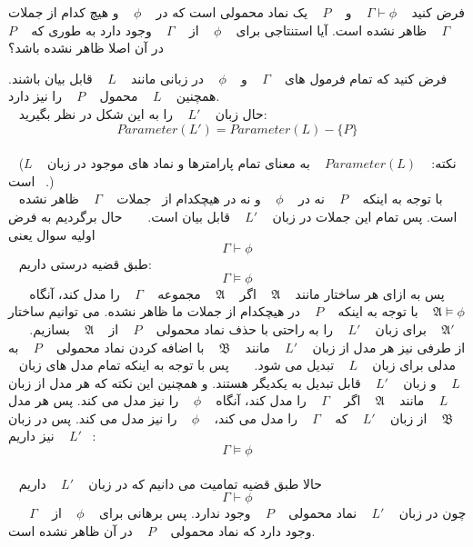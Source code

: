 فرض کنید 
  $\Gamma\vdash\phi$
  و 
  $P$
  یک نماد محمولی است که در
  $\phi$
  و هیچ کدام از جملات 
  $\Gamma$
  ظاهر نشده است. آیا استنتاجی برای 
  $\phi$
  از 
  $\Gamma$
  وجود دارد به طوری که 
  $P$
  در آن اصلا ظاهر نشده باشد؟

  \begin{ans}
  فرض کنید که تمام فرمول های 
  $\Gamma$
  و
  $\phi$
  در زبانی مانند 
  $L$
  قابل بیان باشند. همچنین 
  $L$
  محمول
  $P$
  را نیز دارد. 
  \\
  حال زبان 
  $L'$
  را به این شکل در نظر بگیرید: 
  \[Parameter(L') = Parameter(L) - \{P\} \]
  \\
  (نکته: 
  $Parameter(L)$
  به معنای تمام پارامترها و نماد های موجود در زبان 
  $L$
  است.)
  \\
  با توجه به اینکه
  $P$
  نه در 
  $\phi$
  و نه در هیچکدام از  جملات 
  $\Gamma$
  ظاهر نشده است. پس تمام این جملات در زبان 
  $L'$
  قابل بیان است.
  
  حال برگردیم به فرض اولیه سوال یعنی 
  \[\Gamma\vdash\phi\]
  طبق قضیه درستی داریم:
  \[\Gamma\models\phi\]
  پس به ازای هر ساختار مانند 
  $\mathfrak{A}$
  اگر 
  $\mathfrak{A}$
  مجموعه 
  $\Gamma$
  را مدل کند، آنگاه 
  $\mathfrak{A}\models\phi$
  با توجه به اینکه 
  $P$
  در هیچکدام از جملات ما ظاهر نشده. می توانیم ساختار 
  $\mathfrak{A}'$
  برای زبان 
  $L'$
  را به راحتی با حذف نماد محمولی 
  $P$
  از 
  $\mathfrak{A}$
  بسازیم.
  
  از طرفی نیز هر مدل از زبان 
  $L'$
  مانند 
  $\mathfrak{B}$
  با اضافه کردن نماد محمولی 
  $P$
  به مدلی برای زبان 
  $L$
  تبدیل می شود. 
  
  پس با توجه به اینکه تمام مدل های زبان 
  $L$
  و زبان 
  $L'$
  قابل تبدیل به یکدیگر هستند. و همچنین این نکته که هر مدل از زبان 
  $L$
  مانند 
  $\mathfrak{A}$
  اگر 
  $\Gamma$
  را مدل کند، آنگاه 
  $\phi$
  را نیز مدل می کند. پس هر مدل 
  $\mathfrak{B}$
  از زبان 
  $L'$
  که 
  $\Gamma$
  را مدل می کند، 
  $\phi$
  را نیز مدل می کند. پس در زبان 
  $L'$
  نیز داریم: 
  \[\Gamma\models\phi\]
  \\
  حالا طبق قضیه تمامیت می دانیم که در زبان 
  $L'$
  داریم
  \[\Gamma\vdash\phi\]
  چون در زبان 
  $L'$
  نماد محمولی 
  $P$
  وجود ندارد. پس برهانی برای 
  $\phi$
  از 
  $\Gamma$
  وجود دارد که نماد محمولی 
  $P$
  در آن ظاهر نشده است.
  \end{ans}
